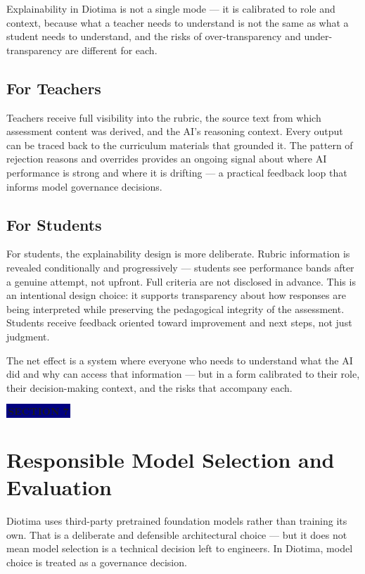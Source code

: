 \documentclass[11pt, a4paper]{article}
\newcommand{\sectiontag}[1]{%
  \vspace{4pt}%
  {\color{white}\colorbox{navy}{\small\bfseries\,#1\,}}%
  \vspace{6pt}%
}
\begin{document}
Explainability in Diotima is not a single mode --- it is calibrated to role and context, because what a teacher needs to understand is not the same as what a student needs to understand, and the risks of over-transparency and under-transparency are different for each.

\subsection{For Teachers}

Teachers receive full visibility into the rubric, the source text from which assessment content was derived, and the AI's reasoning context. Every output can be traced back to the curriculum materials that grounded it. The pattern of rejection reasons and overrides provides an ongoing signal about where AI performance is strong and where it is drifting --- a practical feedback loop that informs model governance decisions.

\subsection{For Students}

For students, the explainability design is more deliberate. Rubric information is revealed conditionally and progressively --- students see performance bands after a genuine attempt, not upfront. Full criteria are not disclosed in advance. This is an intentional design choice: it supports transparency about how responses are being interpreted while preserving the pedagogical integrity of the assessment. Students receive feedback oriented toward improvement and next steps, not just judgment.

The net effect is a system where everyone who needs to understand what the AI did and why can access that information --- but in a form calibrated to their role, their decision-making context, and the risks that accompany each.

\sectiontag{SECTION 7}

\section{Responsible Model Selection and Evaluation}

Diotima uses third-party pretrained foundation models rather than training its own. That is a deliberate and defensible architectural choice --- but it does not mean model selection is a technical decision left to engineers. In Diotima, model choice is treated as a governance decision.
\end{document}
